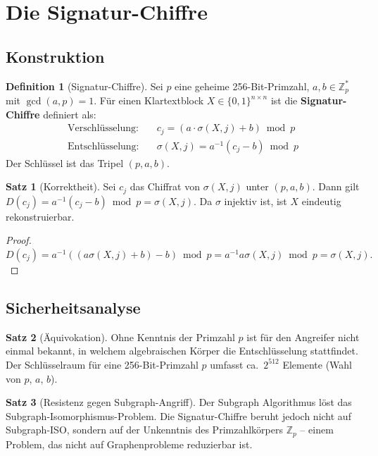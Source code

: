 ﻿\documentclass[a4paper,12pt]{scrreprt}
\theoremstyle{definition}
\newtheorem{definition}{Definition}[section]
\newtheorem{satz}{Satz}[section]
\begin{document}
\section{Die Signatur-Chiffre}

\subsection{Konstruktion}

\begin{definition}[Signatur-Chiffre]
  Sei $p$ eine geheime 256-Bit-Primzahl, $a,b\in\mathbb{Z}_p^*$ mit
  $\gcd(a,p)=1$. Für einen Klartextblock $X \in \{0,1\}^{n\times n}$
  ist die \textbf{Signatur-Chiffre} definiert als:
  \begin{align*}
    \text{Verschlüsselung:} &\quad c_j = (a \cdot \sigma(X,j) + b) \bmod p \\
    \text{Entschlüsselung:} &\quad \sigma(X,j) = a^{-1}(c_j - b) \bmod p
  \end{align*}
  Der Schlüssel ist das Tripel $(p, a, b)$.
\end{definition}

\begin{satz}[Korrektheit]
  Sei $c_j$ das Chiffrat von $\sigma(X,j)$ unter $(p,a,b)$. Dann gilt
  $D(c_j) = a^{-1}(c_j-b)\bmod p = \sigma(X,j)$. Da $\sigma$ injektiv
  ist, ist $X$ eindeutig rekonstruierbar.
\end{satz}

\begin{proof}
  $D(c_j) = a^{-1}((a\sigma(X,j)+b)-b)\bmod p
  = a^{-1} a \sigma(X,j)\bmod p = \sigma(X,j).$
\end{proof}

\subsection{Sicherheitsanalyse}

\begin{satz}[Äquivokation]
  Ohne Kenntnis der Primzahl $p$ ist für den Angreifer nicht einmal
  bekannt, in welchem algebraischen Körper die Entschlüsselung stattfindet.
  Der Schlüsselraum für eine 256-Bit-Primzahl $p$ umfasst ca.\ $2^{512}$
  Elemente (Wahl von $p$, $a$, $b$).
\end{satz}

\begin{satz}[Resistenz gegen Subgraph-Angriff]
  Der Subgraph Algorithmus löst das Subgraph-Isomorphismus-Problem.
  Die Signatur-Chiffre beruht jedoch nicht auf Subgraph-ISO, sondern
  auf der Unkenntnis des Primzahlkörpers $\mathbb{Z}_p$ -- einem Problem,
  das nicht auf Graphenprobleme reduzierbar ist.
\end{satz}
\end{document}
